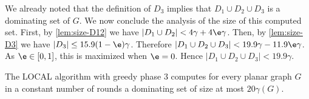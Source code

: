 \medskip

We already noted that the definition of $D_3$ implies that
$D_1\cup D_2\cup D_3$ is a dominating set of $G$. We now conclude the
analysis of the size of this computed set.  First, by
\cref{lem:size-D12} we have $|D_1\cup D_2|<4\gamma+4\e\gamma$.  Then,
by \cref{lem:size-D3} we have $|D_3|\le 15.9(1-\e)\gamma$.
%
Therefore $|D_1 \cup D_2 \cup D_3| < 19.9\gamma -11.9\e\gamma$.
%
As $\e\in[0,1]$, this is maximized when $\e=0$. Hence
\mbox{$|D_1 \cup D_2 \cup D_3|< 19.9 \gamma$}.

\begin{theorem}\label{thm:planar-greedy}
  The LOCAL algorithm with greedy phase $3$ computes for every planar
  graph $G$ in a constant number of rounds a dominating set
  of size at most $20\gamma(G)$.
\end{theorem}
